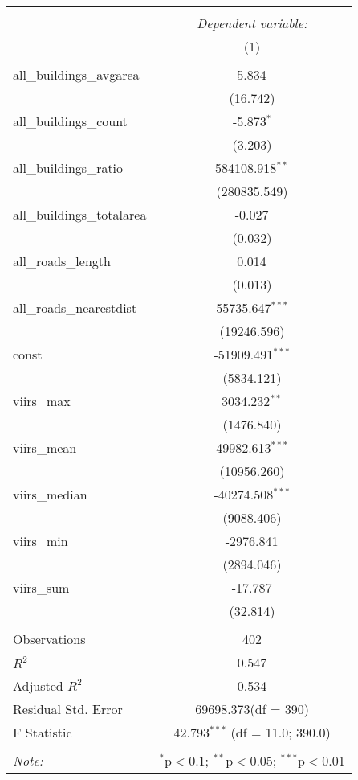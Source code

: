 \begin{table}[!htbp] \centering
\begin{tabular}{@{\extracolsep{5pt}}lc}
\\[-1.8ex]\hline
\hline \\[-1.8ex]
& \multicolumn{1}{c}{\textit{Dependent variable:}} \
\cr \cline{1-2}
\\[-1.8ex] & (1) \\
\hline \\[-1.8ex]
 all_buildings_avgarea & 5.834$^{}$ \\
  & (16.742) \\
 all_buildings_count & -5.873$^{*}$ \\
  & (3.203) \\
 all_buildings_ratio & 584108.918$^{**}$ \\
  & (280835.549) \\
 all_buildings_totalarea & -0.027$^{}$ \\
  & (0.032) \\
 all_roads_length & 0.014$^{}$ \\
  & (0.013) \\
 all_roads_nearestdist & 55735.647$^{***}$ \\
  & (19246.596) \\
 const & -51909.491$^{***}$ \\
  & (5834.121) \\
 viirs_max & 3034.232$^{**}$ \\
  & (1476.840) \\
 viirs_mean & 49982.613$^{***}$ \\
  & (10956.260) \\
 viirs_median & -40274.508$^{***}$ \\
  & (9088.406) \\
 viirs_min & -2976.841$^{}$ \\
  & (2894.046) \\
 viirs_sum & -17.787$^{}$ \\
  & (32.814) \\
\hline \\[-1.8ex]
 Observations & 402 \\
 $R^2$ & 0.547 \\
 Adjusted $R^2$ & 0.534 \\
 Residual Std. Error & 69698.373(df = 390)  \\
 F Statistic & 42.793$^{***}$ (df = 11.0; 390.0) \\
\hline
\hline \\[-1.8ex]
\textit{Note:} & \multicolumn{1}{r}{$^{*}$p$<$0.1; $^{**}$p$<$0.05; $^{***}$p$<$0.01} \\
\end{tabular}
\end{table}